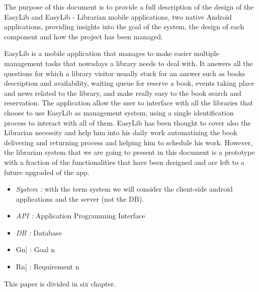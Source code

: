 \vspace*{-5mm}

The purpose of this document is to provide a full description of the design of the
EasyLib and EasyLib - Librarian mobile applications, two native Android applications, providing insights into the goal of the system, the design of each component and how the project has been managed.

EasyLib is a mobile application that manages to make easier multiple management tasks that nowadays a library needs to deal with. It answers all the questions for which a library visitor usually stuck for an answer such as books description and availability, waiting queue for reserve a book, events taking place and news related to the library, and make really easy to the book search and reservation. The application allow the user to interface with all the libraries that choose to use EasyLib as management system, using a single identification process to interact with all of them.
EasyLib has been thought to cover also the Librarian necessity and help him into his daily work automatizing the book delivering and returning process and helping him to schedule his work. However, the librarian system that we are going to present in this document is a prototype with a fraction of the functionalities that have been designed and are left to a future upgraded of the app.


\begin{itemize}
	\item \emph{System :} with the term system we will consider the client-side android applications and the server (not the DB).
\end{itemize}

\begin{itemize}
	\setlength{\leftskip}{0.5cm}
	\item \emph{API :} Application Programming Interface
	\item \emph{DB :} Database
\end{itemize}

\begin{itemize}
	\setlength{\leftskip}{0.5cm}
	\item \lbrack Gn] : Goal n
	\item \lbrack Rn] : Requirement n
\end{itemize}

\newpage
{}
This paper is divided in six chapter.\\

